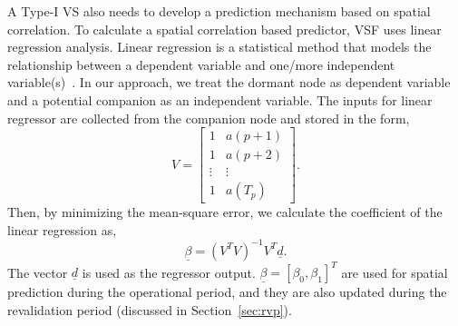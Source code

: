 \documentclass[a4paper,conference]{IEEEtran}
\begin{document}
A Type-I VS also needs to develop a prediction mechanism based on spatial correlation. To calculate a spatial correlation based predictor, VSF uses linear regression analysis. Linear regression is a statistical method that models the relationship between a dependent variable and one/more independent variable(s)~\cite{montgomery2012introduction}. In our approach, we treat the dormant node as dependent variable and a potential companion as an independent variable. The inputs for linear regressor are collected from the companion node and stored in the form,
\begin{equation}
V  =  \left[ \begin{array}{cc}
1 & a(p+1) \\
1 & a(p+2) \\
\vdots & \vdots \\
1 & a(T_{p})
\end{array} \right] .
\end{equation}
Then, by minimizing the mean-square error, we calculate the coefficient of the linear regression as,
\begin{equation}
\underline{\beta}  =  (V^{T}V)^{-1}V^{T}\underline{d}. \label{eq:beta_calcu}
\end{equation}
The vector $\underline{d}$ is used as the regressor output. $\underline{\beta} = [\beta_{0}, \beta_{1}]^{T}$ are used for spatial prediction during the operational period, and they are also updated during the revalidation period (discussed in Section~\ref{sec:rvp}). 
\end{document}
